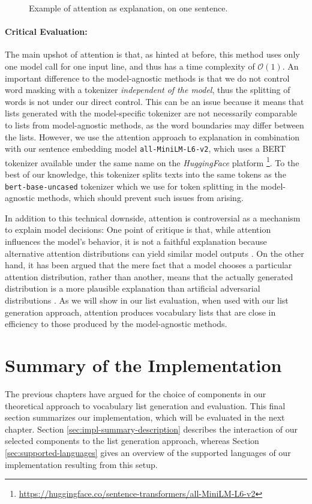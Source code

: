 \begin{figure}[H]
	
	\caption{Example of attention as explanation, on one sentence.}
	\label{fig:attention}
\end{figure}

\paragraph{Critical Evaluation:}
The main upshot of attention is that, as hinted at before, this method uses only one model call for one input line, and thus has a time complexity of $\mathcal{O}(1)$.
An important difference to the model-agnostic methods is that we do not control word masking with a tokenizer \textit{independent of the model}, thus the splitting of words is not under our direct control.
This can be an issue because it means that lists generated with the model-specific tokenizer are not necessarily comparable to lists from model-agnostic methods, as the word boundaries may differ between the lists.
However, we use the attention approach to explanation in combination with our sentence embedding model \texttt{all-MiniLM-L6-v2}, which uses a BERT tokenizer available under the same name on the \textit{HuggingFace} platform \footnote{\url{https://huggingface.co/sentence-transformers/all-MiniLM-L6-v2}}.
To the best of our knowledge, this tokenizer splits texts into the same tokens as the \texttt{bert-base-uncased} tokenizer which we use for token splitting in the model-agnostic methods, which should prevent such issues from arising.

In addition to this technical downside, attention is controversial as a mechanism to explain model decisions:
One point of critique is that, while attention influences the model's behavior, it is not a faithful explanation because alternative attention distributions can yield similar model outputs \cite{jainAttentionNotExplanation2019}.
On the other hand, it has been argued that the mere fact that a model chooses a particular attention distribution, rather than another, means that the actually generated distribution is a more plausible explanation than artificial adversarial distributions \cite{wiegreffeAttentionNotNot2019}.
As we will show in our list evaluation, when used with our list generation approach, attention produces vocabulary lists that are close in efficiency to those produced by the model-agnostic methods.


\section{Summary of the Implementation} \label{sec:implementation-final}
The previous chapters have argued for the choice of components in our theoretical approach to vocabulary list generation and evaluation.
This final section summarizes our implementation, which will be evaluated in the next chapter.
Section \ref{sec:impl-summary-description} describes the interaction of our selected components to the list generation approach, whereas Section \ref{sec:supported-languages} gives an overview of the supported languages of our implementation resulting from this setup.

